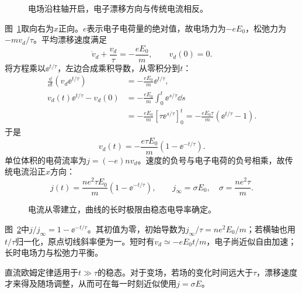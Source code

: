 \begin{figure}[H]\centering
{}
\caption{电场沿柱轴开启，电子漂移方向与传统电流相反。}\label{fig:c1-drift-q}
\end{figure}
\begin{solution}
图~\ref{fig:c1-drift-q}取向右为$x$正向。$e$表示电子电荷量的绝对值，故电场力为$-eE_0$，松弛力为$-mv_d/\tau$。平均漂移速度满足
\[
 \dot v_d+\frac{v_d}{\tau}=-\frac{eE_0}{m},\qquad v_d(0)=0.
\]
将方程乘以$\ee^{t/\tau}$，左边合成乘积导数，从零积分到$t$：
\[\begin{aligned}
 \frac{\dd}{\dd t}(v_d\ee^{t/\tau})&=-\frac{eE_0}{m}\ee^{t/\tau},\\
 v_d(t)\ee^{t/\tau}-v_d(0)
 &=-\frac{eE_0}{m}\int_0^t\ee^{s/\tau}\dd s\\
 &=-\frac{eE_0}{m}[\tau\ee^{s/\tau}]_0^t
 =-\frac{eE_0\tau}{m}(\ee^{t/\tau}-1).
\end{aligned}\]
于是
\[
 \boxed{v_d(t)=-\frac{e\tau E_0}{m}(1-\ee^{-t/\tau})}.
\]
单位体积的电荷流率为$j=(-e)nv_d$。速度的负号与电子电荷的负号相乘，故传统电流沿正$x$方向：
\[
 \boxed{j(t)=\frac{ne^2\tau E_0}{m}(1-\ee^{-t/\tau})},\qquad
 j_\infty=\sigma E_0,\quad \sigma=\frac{ne^2\tau}{m}.
\]
\begin{figure}[H]\centering
{}
\caption{电流从零建立，曲线的长时极限由稳态电导率确定。}\label{fig:c1-drift-s}
\end{figure}
图~\ref{fig:c1-drift-s}中$j/j_\infty=1-\ee^{-t/\tau}$。其初值为零，初始导数为$j_\infty/\tau=ne^2E_0/m$；若横轴也用$t/\tau$归一化，原点切线斜率便为一。短时有$v_d\simeq-eE_0t/m$，电子尚近似自由加速；长时电场力与松弛力平衡。

直流欧姆定律适用于$t\gg\tau$的稳态。对于变场，若场的变化时间远大于$\tau$，漂移速度才来得及随场调整，从而可在每一时刻近似使用$j=\sigma E$。
\end{solution}


